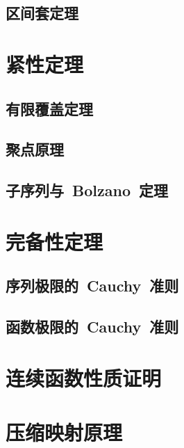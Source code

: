\subsection{区间套定理}
\begin{exercise}

\end{exercise}
\section{紧性定理}
\subsection{有限覆盖定理}
\subsection{聚点原理}
\subsection{子序列与~Bolzano~定理}
\begin{exercise}

\end{exercise}
\section{完备性定理}
\subsection{序列极限的~Cauchy~准则}
\subsection{函数极限的~Cauchy~准则}
\begin{exercise}

\end{exercise}
\section{连续函数性质证明}
\begin{exercise}

\end{exercise}
\section{压缩映射原理}
\begin{exercise}

\end{exercise}
